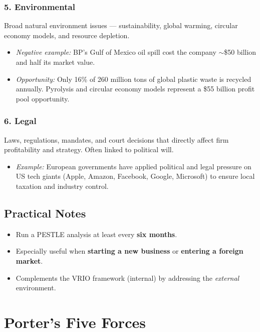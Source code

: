 \documentclass[11pt, letterpaper]{article}
\begin{document}
\subsubsection{5. Environmental}
Broad natural environment issues --- sustainability, global warming, circular economy models, and resource depletion.

\begin{itemize}[leftmargin=*]
  \item \textit{Negative example:} BP's Gulf of Mexico oil spill cost the company $\sim$\$50 billion and half its market value.
  \item \textit{Opportunity:} Only 16\% of 260 million tons of global plastic waste is recycled annually. Pyrolysis and circular economy models represent a \$55 billion profit pool opportunity.
\end{itemize}

\subsubsection{6. Legal}
Laws, regulations, mandates, and court decisions that directly affect firm profitability and strategy. Often linked to political will.

\begin{itemize}[leftmargin=*]
  \item \textit{Example:} European governments have applied political and legal pressure on US tech giants (Apple, Amazon, Facebook, Google, Microsoft) to ensure local taxation and industry control.
\end{itemize}

\subsection{Practical Notes}
\begin{itemize}[leftmargin=*]
  \item Run a PESTLE analysis at least every \textbf{six months}.
  \item Especially useful when \textbf{starting a new business} or \textbf{entering a foreign market}.
  \item Complements the VRIO framework (internal) by addressing the \textit{external} environment.
\end{itemize}

\newpage

\section{Porter's Five Forces}
\end{document}
